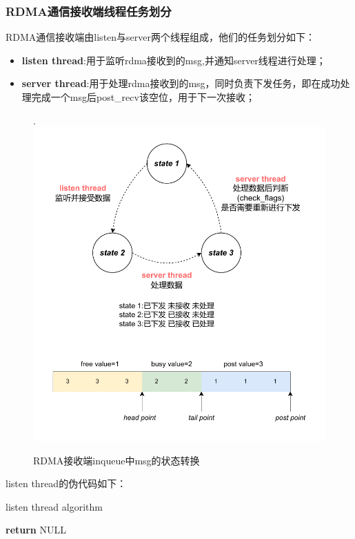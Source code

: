 {\subsubsection{RDMA通信接收端线程任务划分}
RDMA通信接收端由listen与server两个线程组成，他们的任务划分如下：

\begin{itemize}[leftmargin=*, nosep]
    \item \textbf{listen thread}:用于监听rdma接收到的msg,并通知server线程进行处理；
    \item \textbf{server thread}:用于处理rdma接收到的msg，同时负责下发任务，即在成功处理完成一个msg后post\_recv该空位，用于下一次接收；
\end{itemize}

\begin{figure}[H]
    \centering
.    \includegraphics[width=1.0\textwidth]{Img/recv_state.drawio.pdf}
    \caption{RDMA接收端inqueue中msg的状态转换}
\end{figure}
        
listen thread的伪代码如下：
\begin{algorithm}
    \caption{listen thread algorithm}
    \begin{algorithmic}[1] %
            \State {}
            \State \textbf{return} NULL
        \EndProcedure


\end{algorithmic}
\end{algorithm}}
